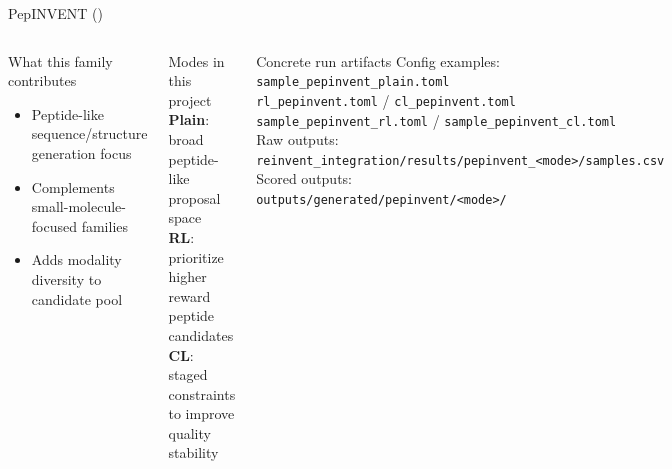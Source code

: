 \documentclass[aspectratio=169,10pt]{beamer}
\begin{document}
\begin{frame}{PepINVENT (\checkmark \checkmark \checkmark)}
  \small
  \begin{columns}[T]
      \begin{block}{What this family contributes}
        \begin{itemize}
          \item Peptide-like sequence/structure generation focus
          \item Complements small-molecule-focused families
          \item Adds modality diversity to candidate pool
        \end{itemize}
      \end{block}
      \begin{block}{Modes in this project}
        \textbf{Plain}: broad peptide-like proposal space\\
        \textbf{RL}: prioritize higher reward peptide candidates\\
        \textbf{CL}: staged constraints to improve quality stability
      \end{block}
      \begin{block}{Concrete run artifacts}
        Config examples:\\
        {\scriptsize\texttt{sample\_pepinvent\_plain.toml}}\\
        {\scriptsize\texttt{rl\_pepinvent.toml}} / {\scriptsize\texttt{cl\_pepinvent.toml}}\\
        {\scriptsize\texttt{sample\_pepinvent\_rl.toml}} / {\scriptsize\texttt{sample\_pepinvent\_cl.toml}}\\[2pt]
        Raw outputs:\\
        {\scriptsize\texttt{reinvent\_integration/results/pepinvent\_<mode>/samples.csv}}\\
        Scored outputs:\\
        {\scriptsize\texttt{outputs/generated/pepinvent/<mode>/}}
      \end{block}
  \end{columns}
\end{frame}
\end{document}
